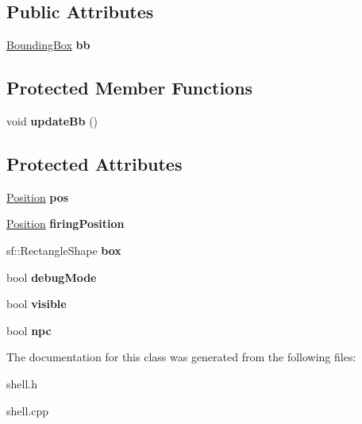\subsection*{Public Attributes}
\begin{DoxyCompactItemize}
\item 
\mbox{\label{class_shell_a111217ec1fa16f95690a68a6f3150048}} 
\mbox{\hyperlink{class_bounding_box}{Bounding\+Box}} {\bfseries bb}
\end{DoxyCompactItemize}
\subsection*{Protected Member Functions}
\begin{DoxyCompactItemize}
\item 
\mbox{\label{class_shell_a59fee1db1f35166986121dfcdbab3a4f}} 
void {\bfseries update\+Bb} ()
\end{DoxyCompactItemize}
\subsection*{Protected Attributes}
\begin{DoxyCompactItemize}
\item 
\mbox{\label{class_shell_aa616cb1bfcd1e807c1bcaeef8fea691e}} 
\mbox{\hyperlink{class_position}{Position}} {\bfseries pos}
\item 
\mbox{\label{class_shell_a3767a511c51267156173ee866a3328b7}} 
\mbox{\hyperlink{class_position}{Position}} {\bfseries firing\+Position}
\item 
\mbox{\label{class_shell_a79b3bf24805872c786092a3ac9269707}} 
sf\+::\+Rectangle\+Shape {\bfseries box}
\item 
\mbox{\label{class_shell_a08fbc870060f59807f45e5ee08841151}} 
bool {\bfseries debug\+Mode}
\item 
\mbox{\label{class_shell_ac61119f0a9d9941ae0d66c12d124e2e6}} 
bool {\bfseries visible}
\item 
\mbox{\label{class_shell_a33a31cb9ce411ec7eed0a3a8105f8a35}} 
bool {\bfseries npc}
\end{DoxyCompactItemize}


The documentation for this class was generated from the following files\+:\begin{DoxyCompactItemize}
\item 
shell.\+h\item 
shell.\+cpp\end{DoxyCompactItemize}
